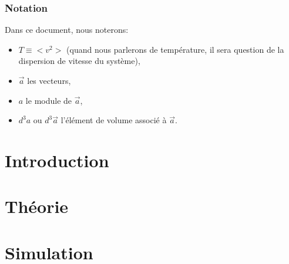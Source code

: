 \documentclass[a4paper,11pt,twoside,openright]{report}
\renewcommand{\(}{\ensuremath{\left(}}
\renewcommand{\)}{\ensuremath{\right)}}
\begin{document}
		

	\small \tableofcontents
	\listoffigures
	\normalsize

	\newpage

	\section*{Notation}
		Dans ce document, nous noterons:
		\begin{itemize}
			\item $T \equiv <v^2>$ (quand nous parlerons de température, il sera question de la dispersion de vitesse du système),
			\item $\vec{a}$ les vecteurs,
			\item $a$ le module de $\vec{a}$,
			\item $d^3 a$ ou $d^3 \vec{a}$ l'élément de volume associé à $\vec{a}$.
		\end{itemize}


	\normalsize

	\part*{Introduction}
	\pagestyle{these}

		

	\part{Théorie}
		


	\part{Simulation}
		
\end{document}
